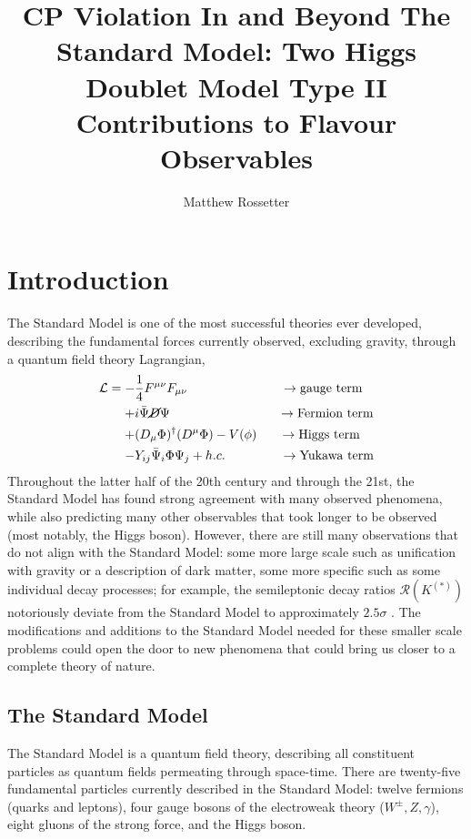 \documentclass[a4paper,12pt]{article}
\title{CP Violation In and Beyond The Standard Model: Two Higgs Doublet Model Type II Contributions to Flavour Observables}
\author{Matthew Rossetter}
\affiliation{Supervised By Alexander Lenz}
\affiliation{MPhys Theoretical Physics, Durham University}
\begin{document}
 
\maketitle

\section{Introduction}
The Standard Model is one of the most successful theories ever developed, describing the fundamental forces currently observed, excluding gravity, through a quantum field theory Lagrangian, 
\begin{equation}
    \label{eq:sm}
    \begin{split}
        \mathcal{L} = -&\frac14 F^{\mu\nu}F_{\mu\nu} \qquad\qquad\qquad\quad\;\to \text{gauge term}\\
                      +& i\bar{\Psi}\cancel{D}\Psi \qquad\qquad\qquad\qquad\;\,\to \text{Fermion term} \\
                      +& (D_\mu\Phi)^\dagger(D^\mu\Phi) - V(\phi) \quad\;\;\,\to \text{Higgs term}\\
                      -& Y_{ij}\bar{\Psi}_i\Phi\Psi_j + h.c. \qquad\qquad\;\to\text{Yukawa term}
    \end{split}
\end{equation}
Throughout the latter half of the 20th century and through the 21st, the Standard Model has found strong agreement with many observed phenomena, while also predicting many other observables that took longer to be observed (most notably, the Higgs boson).
However, there are still many observations that do not align with the Standard Model: some more large scale such as unification with gravity or a description of dark matter, some more specific such as some individual decay processes; for example, the semileptonic decay ratios $\mathcal{R}(K^{(*)})$ notoriously deviate from the Standard Model to approximately $2.5\sigma$ \cite{pdg}.
The modifications and additions to the Standard Model needed for these smaller scale problems could open the door to new phenomena that could bring us closer to a complete theory of nature. 

\subsection{The Standard Model}
The Standard Model is a quantum field theory, describing all constituent particles as quantum fields permeating through space-time. 
There are twenty-five fundamental particles currently described in the Standard Model: twelve fermions (quarks and leptons), four gauge bosons of the electroweak theory ($W^\pm,Z,\gamma$), eight gluons of the strong force, and the Higgs boson.
\end{document}
